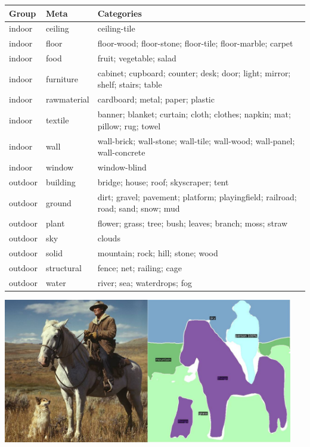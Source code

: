 \documentclass[12pt,ignorenonframetext,aspectratio=169]{beamer}
\begin{document}
\begin{frame}{}
  \fontsize{9}{11}\selectfont
  \centering

  \begin{tabular}{lll}
   \hline
  \textbf{Group} & \textbf{Meta} & \textbf{Categories} \\
   \hline
   indoor & ceiling & ceiling-tile \\
   indoor & floor & floor-wood; floor-stone; floor-tile; floor-marble; carpet \\
   indoor & food & fruit; vegetable; salad \\
   indoor & furniture & cabinet; cupboard; counter; desk; door; light; mirror; shelf; stairs; table \\
   indoor & rawmaterial & cardboard; metal; paper; plastic \\
   indoor & textile & banner; blanket; curtain; cloth; clothes; napkin; mat; pillow; rug; towel \\
   indoor & wall & wall-brick; wall-stone; wall-tile; wall-wood; wall-panel; wall-concrete \\
   indoor & window & window-blind \\ \hline
   outdoor & building & bridge; house; roof; skyscraper; tent \\
   outdoor & ground & dirt; gravel; pavement; platform; playingfield; railroad; road; sand; snow; mud \\
   outdoor & plant & flower; grass; tree; bush; leaves; branch; moss; straw \\
   outdoor & sky & clouds \\
   outdoor & solid & mountain; rock; hill; stone; wood \\
   outdoor & structural & fence; net; railing; cage \\
   outdoor & water & river; sea; waterdrops; fog \\
    \hline
  \end{tabular}


\end{frame}

\begin{frame}{}

\begin{center}
\includegraphics[width=0.95\textwidth]{../figures/segmentation_examples_small.jpg}
\end{center}

\end{frame}
\end{document}
